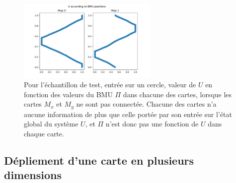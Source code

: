 \begin{figure}
\centering
\includegraphics[width = 0.6\textwidth]{xu_yu_unco.pdf}
\caption{Pour l'échantillon de test, entrée sur un cercle, valeur de $U$ en fonction des valeurs du BMU $\Pi$ dans chacune des cartes, lorsque les cartes $M_x$ et $M_y$ ne sont pas connectée. Chacune des cartes n'a aucune information de plus que celle portée par son entrée sur l'état global du système $U$, et $\Pi$ n'est donc pas une fonction de $U$ dans chaque carte. }
\label{fig:piu_indep}
\end{figure}


\subsection{Dépliement d'une carte en plusieurs dimensions}

